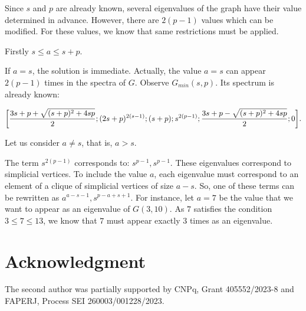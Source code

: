 \documentclass[preprint,12pt]{elsarticle}
\begin{document}
Since $s$ and $p$ are already known, several eigenvalues of the graph have their value determined in advance.
However, there are $2(p-1)$ values which can be modified.
For these values, we know that same restrictions must be applied.

Firstly $s \leq a \leq s+p$. 

 If $a = s$, the solution is immediate.
Actually, the value $a=s$ can appear $2(p-1)$ times in the spectra of $G$.
Observe $G_{min}(s,p)$.
Its spectrum is already known:


\[
\bigg[  \frac{3s+p  +\sqrt{(s+p)^2 + 4sp}}{2};( 2s+p)^{2(s-1)};(s+p); s^{2(p-1)};\\
\frac{3s+p - \sqrt{(s+p)^2 + 4sp}}{2};0\bigg].
\]

Let us consider $a \neq s$, that is, $a > s$.

The term $s^{2(p-1)}$ corresponds to:
$s^{p-1}, s^{p-1}$.
These eigenvalues correspond to simplicial vertices.
To include the value $a$, each eigenvalue must correspond to an element of a  clique of simplicial vertices of size $a-s$.
So, one of these terms can be rewritten as $a^{a-s-1}, s^{p-a+s+1}$.
For instance, let $a=7$ be the value that  we want to appear as an eigenvalue of $G(3,10)$.
As $7$ satisfies the condition $3 \leq 7\leq 13$,
we know that $7$ must appear exactly  $3$ times  as an eigenvalue.




\section{Acknowledgment}The second author was partially supported by CNPq, Grant 405552/2023-8 and FAPERJ, Process SEI 260003/001228/2023.


\end{document}
